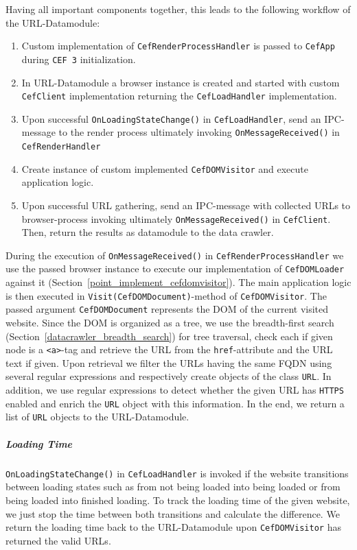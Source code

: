 Having all important components together, this leads to the following workflow of the URL-Datamodule:

\begin{enumerate}
	\item Custom implementation of \texttt{CefRenderProcessHandler} is passed to \texttt{CefApp} during \texttt{CEF 3} initialization.
	\item In URL-Datamodule a browser instance is created and started with custom \texttt{CefClient} implementation returning the \texttt{CefLoadHandler} implementation.
	\item Upon successful \texttt{OnLoadingStateChange()} in \texttt{CefLoadHandler}, send an IPC-message to the render process ultimately invoking \texttt{OnMessageReceived()} in \texttt{CefRenderHandler}
	\item Create instance of custom implemented \texttt{CefDOMVisitor} and execute application logic.
	\label{point_implement_cefdomvisitor}
	\item Upon successful URL gathering, send an IPC-message with collected URLs to browser-process invoking ultimately \texttt{OnMessageReceived()} in \texttt{CefClient}. Then, return the results as datamodule to the data crawler.
\end{enumerate}  

During the execution of \texttt{OnMessageReceived()} in \texttt{CefRenderProcessHandler} we use the passed browser instance to execute our implementation of \texttt{CefDOMLoader} against it (Section~\ref{point_implement_cefdomvisitor}). The main application logic is then executed in \texttt{Visit(CefDOMDocument)}-method of \texttt{CefDOMVisitor}. The passed argument \texttt{CefDOMDocument} represents the DOM of the current visited website. Since the DOM is organized as a tree, we use the breadth-first search (Section~\ref{datacrawler_breadth_search}) for tree traversal, check each if given node is a \texttt{<a>}-tag and retrieve the URL from the \texttt{href}-attribute and the URL text if given. Upon retrieval we filter the URLs having the same FQDN using several regular expressions and respectively create objects of the class \texttt{URL}. In addition, we use regular expressions to detect whether the given URL has \texttt{HTTPS} enabled and enrich the \texttt{URL} object with this information. In the end, we return a list of \texttt{URL} objects to the URL-Datamodule.

\subparagraph*{Loading Time}
\texttt{OnLoadingStateChange()} in \texttt{CefLoadHandler} is invoked if the website transitions between loading states such as from not being loaded into being loaded or from being loaded into finished loading. To track the loading time of the given website, we just stop the time between both transitions and calculate the difference. We return the loading time back to the URL-Datamodule upon \texttt{CefDOMVisitor} has returned the valid URLs.

